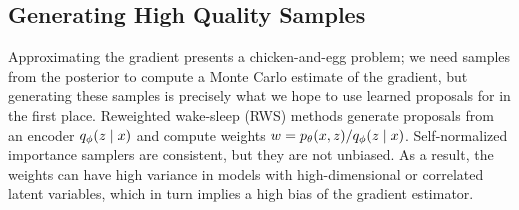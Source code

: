 \documentclass[anonymous=false, %
               format=acmsmall, %
               review=true, %
               screen=true, %
               nonacm=true]{acmart}
\theoremstyle{definition}
\begin{document}

\subsection{Generating High Quality Samples}
Approximating the gradient presents a chicken-and-egg problem; we need samples from the posterior to compute a Monte Carlo estimate of the gradient, but generating these samples is precisely what we hope to use learned proposals for in the first place. 
Reweighted wake-sleep (RWS) methods \cite{le2019revisiting} generate proposals from an encoder $q_\phi(z \mid x)$ and compute weights $w = p_\theta(x, z) / q_\phi(z \mid x)$. Self-normalized importance samplers are consistent, but they are not unbiased. As a result, the weights can have high variance in models with high-dimensional or correlated latent variables, which in turn implies a high bias of the gradient estimator. 
\end{document}
